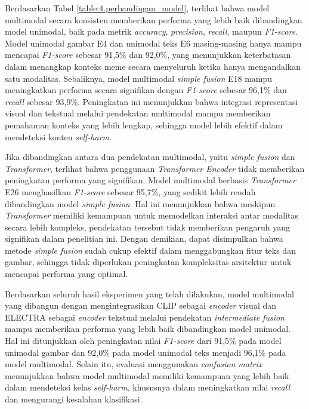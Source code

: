 Berdasarkan Tabel \ref{table:4.perbandingan_model}, terlihat bahwa model multimodal secara konsisten memberikan performa yang lebih baik dibandingkan model unimodal, baik pada metrik \textit{accuracy}, \textit{precision}, \textit{recall}, maupun \textit{F1-score}. Model unimodal gambar E4 dan unimodal teks E6 masing-masing hanya mampu mencapai \textit{F1-score} sebesar 91,5\% dan 92,0\%, yang menunjukkan keterbatasan dalam menangkap konteks meme secara menyeluruh ketika hanya mengandalkan satu modalitas. Sebaliknya, model multimodal \textit{simple fusion} E18 mampu meningkatkan performa secara signifikan dengan \textit{F1-score} sebesar 96,1\% dan \textit{recall} sebesar 93,9\%. Peningkatan ini menunjukkan bahwa integrasi representasi visual dan tekstual melalui pendekatan multimodal mampu memberikan pemahaman konteks yang lebih lengkap, sehingga model lebih efektif dalam mendeteksi konten \textit{self-harm}.

Jika dibandingkan antara dua pendekatan multimodal, yaitu \textit{simple fusion} dan \textit{Transformer}, terlihat bahwa penggunaan \textit{Transformer Encoder} tidak memberikan peningkatan performa yang signifikan. Model multimodal berbasis \textit{Transformer} E26 menghasilkan \textit{F1-score} sebesar 95,7\%, yang sedikit lebih rendah dibandingkan model \textit{simple fusion}. Hal ini menunjukkan bahwa meskipun \textit{Transformer} memiliki kemampuan untuk memodelkan interaksi antar modalitas secara lebih kompleks, pendekatan tersebut tidak memberikan pengaruh yang signifikan dalam penelitian ini. Dengan demikian, dapat disimpulkan bahwa metode \textit{simple fusion} sudah cukup efektif dalam menggabungkan fitur teks dan gambar, sehingga tidak diperlukan peningkatan kompleksitas arsitektur untuk mencapai performa yang optimal.

Berdasarkan seluruh hasil eksperimen yang telah dilakukan,  model multimodal yang dibangun dengan mengintegrasikan CLIP sebagai \textit{encoder} visual dan ELECTRA sebagai \textit{encoder} tekstual melalui pendekatan \textit{intermediate fusion} mampu memberikan performa yang lebih baik dibandingkan model unimodal. Hal ini ditunjukkan oleh peningkatan nilai \textit{F1-score} dari 91,5\% pada model unimodal gambar dan 92,0\% pada model unimodal teks menjadi 96,1\% pada model multimodal. Selain itu, evaluasi menggunakan \textit{confusion matrix} menunjukkan bahwa model multimodal memiliki kemampuan yang lebih baik dalam mendeteksi kelas \textit{self-harm}, khususnya dalam meningkatkan nilai \textit{recall} dan mengurangi kesalahan klasifikasi.

